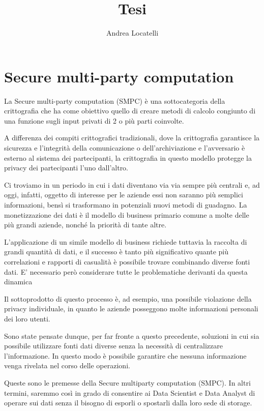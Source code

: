 \documentclass[
  italian,
]{book}
\title{Tesi}
\author{Andrea Locatelli}
\date{}
\begin{document}
\maketitle

{
\setcounter{tocdepth}{1}
\tableofcontents
}
\hypertarget{secure-multi-party-computation}{%
\chapter{Secure multi-party computation}\label{secure-multi-party-computation}}

La Secure multi-party computation (SMPC) è una sottocategoria della crittografia che ha come obiettivo quello di creare metodi di calcolo congiunto di una funzione sugli input privati di 2 o più parti coinvolte.

A differenza dei compiti crittografici tradizionali, dove la crittografia garantisce la sicurezza e l'integrità della comunicazione o dell'archiviazione e l'avversario è esterno al sistema dei partecipanti, la crittografia in questo modello protegge la privacy dei partecipanti l'uno dall'altro.

Ci troviamo in un periodo in cui i dati diventano via via sempre più centrali e, ad oggi, infatti, oggetto di interesse per le aziende essi non saranno più semplici informazioni, bensì si trasformano in potenziali nuovi metodi di guadagno. La monetizzazione dei dati è il modello di business primario comune a molte delle più grandi aziende, nonché la priorità di tante altre.

L'applicazione di un simile modello di business richiede tuttavia la raccolta di grandi quantità di dati, e il successo è tanto più significativo quante più correlazioni e rapporti di casualità è possibile trovare combinando diverse fonti dati. E' necessario però considerare tutte le problematiche derivanti da questa dinamica

Il sottoprodotto di questo processo è, ad esempio, una possibile violazione della privacy individuale, in quanto le aziende posseggono molte informazioni personali dei loro utenti.

Sono state pensate dunque, per far fronte a questo precedente, soluzioni in cui sia possibile utilizzare fonti dati diverse senza la necessità di centralizzare l'informazione. In questo modo è possibile garantire che nessuna informazione venga rivelata nel corso delle operazioni.

Queste sono le premesse della Secure multiparty computation (SMPC). In altri termini, saremmo così in grado di consentire ai Data Scientist e Data Analyst di operare sui dati senza il bisogno di esporli o spostarli dalla loro sede di storage.
\end{document}
